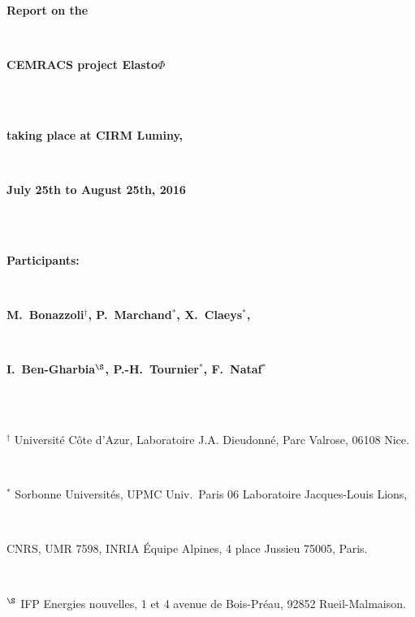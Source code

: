 

\thispagestyle{empty}

\centerline{\textbf{\huge Report on the}}
\quad\\[5pt]
\centerline{\textbf{\huge CEMRACS project Elasto$\Phi$}}
\quad\\[5pt]
\vspace{1cm}
\quad\\
\centerline{\textbf{\Large taking place at CIRM Luminy,}}\quad\\[5pt]
\centerline{\textbf{\Large July 25th to August 25th, 2016}}\quad\\[5pt]
\vspace{1cm}
\quad\\
\centerline{\textbf{\Large Participants:}}\quad\\[15pt]
\centerline{\textbf{\Large M.~Bonazzoli$^{\dagger}$, P.~Marchand$^{*}$, X.~Claeys$^{*}$,}}\quad\\[5pt]
\centerline{\textbf{\Large I.~Ben-Gharbia$^{\S}$, P.-H.~Tournier$^{*}$, F.~Nataf$^{*}$}}\quad\\[5pt]
\vspace{0.25cm}\quad\\
\centerline{$^{\dagger}$ Universit\'e C\^ote d'Azur, Laboratoire J.A. Dieudonn\'e, Parc Valrose, 06108 Nice.}\,\\
\centerline{$^{*}$ Sorbonne Universit\'es, UPMC Univ.~Paris 06 Laboratoire Jacques-Louis Lions,}\,\\
\centerline{CNRS, UMR 7598, INRIA \'Equipe Alpines, 4 place Jussieu 75005, Paris.}\,\\
\centerline{$^{\S}$ IFP Energies nouvelles, 1 et 4 avenue de Bois-Pr\'eau, 92852 Rueil-Malmaison.}



